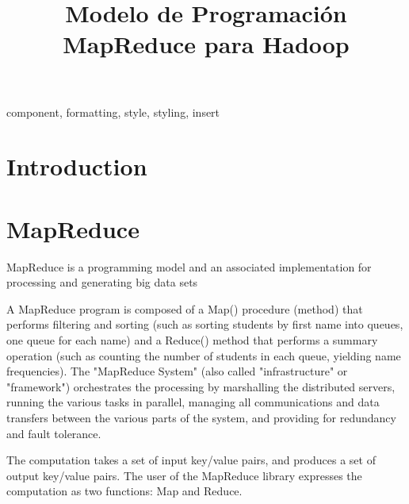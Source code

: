 \documentclass[conference]{IEEEtran}
\begin{document}
\title{Modelo de Programación MapReduce para Hadoop}

\author{
}

\maketitle

\begin{abstract}


\end{abstract}

\begin{IEEEkeywords}
component, formatting, style, styling, insert
\end{IEEEkeywords}

\section{Introduction}


\cite{MapReduceII08}
\cite{GoogleFS03}
\cite{BigTable08}
\cite{Holmes12}


\section{MapReduce}

MapReduce is a programming model and an associated implementation for processing and generating big data sets~\cite{MapReduce04}


A MapReduce program is composed of a Map() procedure (method) that performs filtering and sorting (such as sorting students by first name into queues, one queue for each name) and a Reduce() method that performs a summary operation (such as counting the number of students in each queue, yielding name frequencies). The "MapReduce System" (also called "infrastructure" or "framework") orchestrates the processing by marshalling the distributed servers, running the various tasks in parallel, managing all communications and data transfers between the various parts of the system, and providing for redundancy and fault tolerance.



The computation takes a set of input key/value pairs, and
produces a set of output key/value pairs. The user of
the MapReduce library expresses the computation as two
functions: Map and Reduce.
\end{document}
